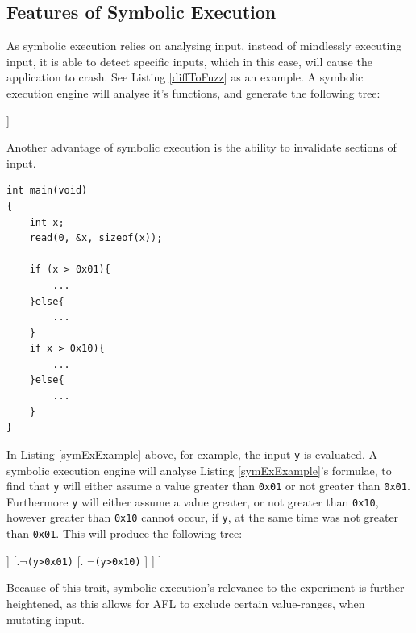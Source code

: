\documentclass[a4paper]{article}
\newcommand{\ttt}[1]{\texttt{#1}}
\begin{document}
\subsection{Features of Symbolic Execution}
\label{sec:FeaturesSymEx}
As symbolic execution relies on analysing input, instead of mindlessly executing input, it is able to detect specific inputs, which in this case, will cause the application to crash. See Listing \ref{diffToFuzz} as an example. A symbolic execution engine will analyse it's functions, and generate the following tree:\\
\centerline{\Tree [.$\emptyset$ [. \ttt{x==0x12345678} $\neg$\ttt{(x==0x12345678)} ] ]}
\noindent Another advantage of symbolic execution is the ability to invalidate sections of input.
\begin{lstlisting}[caption=Example of Symbolic Execution, label=symExExample, captionpos=b]
int main(void)
{
    int x;
    read(0, &x, sizeof(x));
    
    if (x > 0x01){
        ...
    }else{
        ...
    }
    if x > 0x10){
        ...
    }else{
        ...
    }
}
\end{lstlisting}
In Listing \ref{symExExample} above, for example, the input \ttt{y} is evaluated. A symbolic execution engine will analyse Listing \ref{symExExample}'s formulae, to find that \ttt{y} will either assume a value greater than \ttt{0x01} or not greater than \ttt{0x01}. Furthermore \ttt{y} will either assume a value greater, or not greater than \ttt{0x10}, however greater than \ttt{0x10} cannot occur, if \ttt{y}, at the same time was not greater than \ttt{0x01}. This will produce the following tree:\\
\centerline{
	\Tree [.$\emptyset$
			[.\ttt{y>0x01} 
				[. \ttt{y>10} 
				   \ttt{$\neg$(y>0x10)}
				]
			]
			[.\ttt{$\neg$(y>0x01)}
				[. \xout{\ttt{y>0x10}} 
				   \ttt{$\neg$(y>0x10)} 
				]
			]
		]
}
Because of this trait, symbolic execution's relevance to the experiment is further heightened, as this allows for AFL to exclude certain value-ranges, when mutating input.
\end{document}
